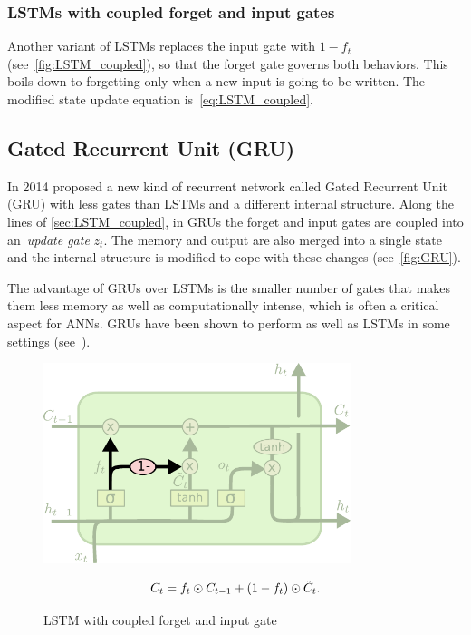 \subsubsection{LSTMs with coupled forget and input gates}\label{sec:LSTM_coupled}

Another variant of LSTMs replaces the input gate with $1 - f_t$
(see~\autoref{fig:LSTM_coupled}), so that the forget gate governs both
behaviors. This boils down to forgetting only when a new input is going to be
written. The modified state update equation is~\autoref{eq:LSTM_coupled}.

\subsection{Gated Recurrent Unit (GRU)}


In 2014 \cite{Cho2014a} proposed a new kind of recurrent network called Gated
Recurrent Unit (GRU) with less gates than LSTMs and a different internal
structure. Along the lines of \autoref{sec:LSTM_coupled}, in GRUs the forget
and input gates are coupled into an~\emph{update gate} $z_t$. The memory and
output are also merged into a single state and the internal structure is
modified to cope with these changes (see~\autoref{fig:GRU}).

The advantage of GRUs over LSTMs is the smaller number of gates that makes them
less memory as well as computationally intense, which is often a critical
aspect for ANNs. GRUs have been shown to perform as well as LSTMs in some
settings (see~\cite{Chung-et-al-NIPSDL2014-small}).


\begin{figure}[pt]
\begin{minipage}{0.5\textwidth}
    \centering
    \includegraphics[width=0.8\textwidth]{pdf/LSTM_coupled.pdf}
    \caption{LSTM with coupled forget and input gate\label{fig:LSTM_coupled}}
\end{minipage}
\begin{minipage}{0.5\textwidth}
    \setlength\abovedisplayshortskip{0pt}
    \setlength\belowdisplayshortskip{0pt}
    \strut
    \begin{equation}\label{eq:LSTM_coupled}
        C_t = f_t \odot C_{t-1} + (1 - f_t) \odot \tilde C_t.
    \end{equation}
    \strut
\end{minipage}
\end{figure}

